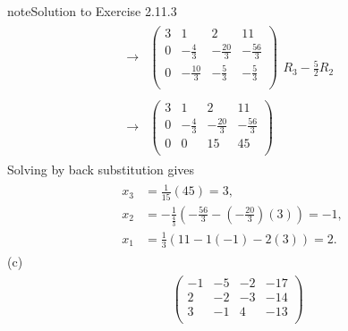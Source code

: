 \documentclass[letterpaper,10pt,english]{jupyterBook}
\begin{document}
\begin{sphinxadmonition}{note}{Solution to Exercise 2.11.3}
\begin{equation*}
\begin{split}
\begin{align*}
    \longrightarrow 
    & \left( \begin{array}{ccc|c} 
         3 & 1 & 2 & 11 \\ 
         0 & - \frac{4}{3} & - \frac{20}{3} & - \frac{56}{3} \\ 
         0 & - \frac{10}{3} & - \frac{5}{3} & - \frac{5}{3} \\ 
    \end{array} \right) 
    \begin{array}{l} \phantom{x} \\ \phantom{x} \\ R_{3} - \frac{5}{2} R_{2} \end{array} \\ \\ 
    \longrightarrow 
    & \left( \begin{array}{ccc|c} 
         3 & 1 & 2 & 11 \\ 
         0 & - \frac{4}{3} & - \frac{20}{3} & - \frac{56}{3} \\ 
         0 & 0 & 15 & 45 \\ 
    \end{array} \right) 
\end{align*} \end{split}
\end{equation*}
\sphinxAtStartPar
Solving by back substitution gives
\begin{equation*}
\begin{split} \begin{align*} 
    x_{3} &=  \frac{1}{15} \left( 45 \right) = 3, \\ 
    x_{2} &=  - \frac{1}{\frac{4}{3}} \left( - \frac{56}{3} - \left( - \frac{20}{3} \right) \left( 3 \right) \right) = -1, \\ 
    x_{1} &=  \frac{1}{3} \left( 11 - 1 \left( -1 \right) - 2 \left( 3 \right) \right) = 2. 
\end{align*} \end{split}
\end{equation*}
\sphinxAtStartPar
(c)
\begin{equation*}
\begin{split} \begin{align*} 
    & \left( \begin{array}{ccc|c} 
         -1 & -5 & -2 & -17 \\ 
         2 & -2 & -3 & -14 \\ 
         3 & -1 & 4 & -13 \\ 
    \end{array} \right) 

\end{align*}
\end{split}
\end{equation*}
\end{sphinxadmonition}
\end{document}
